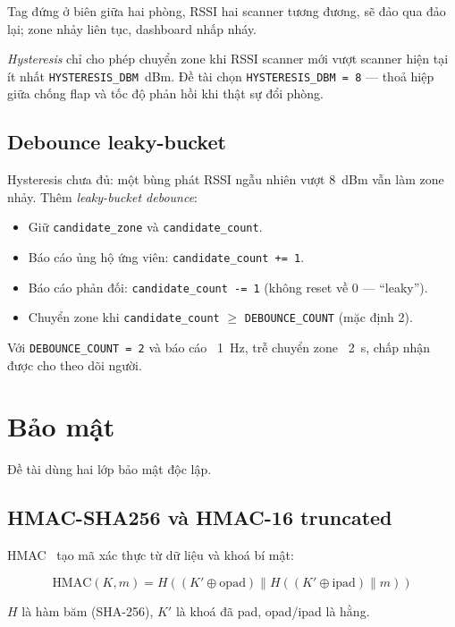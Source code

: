 Tag đứng ở biên giữa hai phòng, RSSI hai scanner tương đương, sẽ đảo qua đảo lại; zone nhảy liên tục, dashboard nhấp nháy.

\textit{Hysteresis} chỉ cho phép chuyển zone khi RSSI scanner mới vượt scanner hiện tại ít nhất \texttt{HYSTERESIS\_DBM}~dBm. Đề tài chọn \texttt{HYSTERESIS\_DBM = 8} --- thoả hiệp giữa chống flap và tốc độ phản hồi khi thật sự đổi phòng.

\subsection{Debounce leaky-bucket}

Hysteresis chưa đủ: một bùng phát RSSI ngẫu nhiên vượt 8~dBm vẫn làm zone nhảy. Thêm \textit{leaky-bucket debounce}:

\begin{itemize}
    \item Giữ \texttt{candidate\_zone} và \texttt{candidate\_count}.
    \item Báo cáo ủng hộ ứng viên: \texttt{candidate\_count += 1}.
    \item Báo cáo phản đối: \texttt{candidate\_count -= 1} (không reset về 0 --- ``leaky'').
    \item Chuyển zone khi \texttt{candidate\_count} $\geq$ \texttt{DEBOUNCE\_COUNT} (mặc định 2).
\end{itemize}

Với \texttt{DEBOUNCE\_COUNT = 2} và báo cáo ~1~Hz, trễ chuyển zone ~2~s, chấp nhận được cho theo dõi người.

\section{Bảo mật}
\label{sec:security}

Đề tài dùng hai lớp bảo mật độc lập.

\subsection{HMAC-SHA256 và HMAC-16 truncated}

HMAC~\cite{rfc2104} tạo mã xác thực từ dữ liệu và khoá bí mật:

\begin{equation}
    \text{HMAC}(K, m) = H\left((K' \oplus \text{opad}) \parallel H((K' \oplus \text{ipad}) \parallel m)\right)
    \label{eq:hmac}
\end{equation}

$H$ là hàm băm (SHA-256), $K'$ là khoá đã pad, opad/ipad là hằng.

